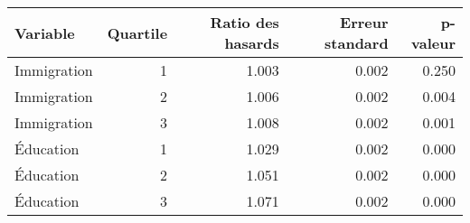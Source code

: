 \begin{longtable}{lrrrr}
\toprule
Variable & Quartile & Ratio des hasards & Erreur standard & p-valeur \\ 
\midrule
Immigration & 1 & 1.003 & 0.002 & 0.250 \\ 
Immigration & 2 & 1.006 & 0.002 & 0.004 \\ 
Immigration & 3 & 1.008 & 0.002 & 0.001 \\ 
Éducation & 1 & 1.029 & 0.002 & 0.000 \\ 
Éducation & 2 & 1.051 & 0.002 & 0.000 \\ 
Éducation & 3 & 1.071 & 0.002 & 0.000 \\ 
\bottomrule
\end{longtable}

